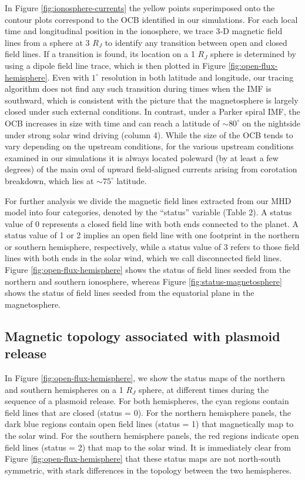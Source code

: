 In Figure \ref{fig:ionosphere-currents} the yellow points superimposed onto the contour plots correspond to the OCB identified in our simulations. For each local time and longitudinal position in the ionosphere, we trace 3‐D magnetic field lines from a sphere at 3 $R_J$ to identify any transition between open and closed field lines. If a transition is found, its location on a 1 $R_J$ sphere is determined by using a dipole field line trace, which is then plotted in Figure \ref{fig:open-flux-hemisphere}. Even with $1^\circ$ resolution in both latitude and longitude, our tracing algorithm does not find any such transition during times when the IMF is southward, which is consistent with the picture that the magnetosphere is largely closed under such external conditions. In contrast, under a Parker spiral IMF, the OCB increases in size with time and can reach a latitude of $\sim80^\circ$ on the nightside under strong solar wind driving (column 4). While the size of the OCB tends to vary depending on the upstream conditions, for the various upstream conditions examined in our simulations it is always located poleward (by at least a few degrees) of the main oval of upward field‐aligned currents arising from corotation breakdown, which lies at $\sim75^\circ$ latitude. 

For further analysis we divide the magnetic field lines extracted from our MHD model into four categories, denoted by the “status” variable (Table 2). A status value of 0 represents a closed field line with both ends connected to the planet. A status value of 1 or 2 implies an open field line with one footprint in the northern or southern hemisphere, respectively, while a status value of 3 refers to those field lines with both ends in the solar wind, which we call disconnected field lines. Figure \ref{fig:open-flux-hemisphere} shows the status of field lines seeded from the northern and southern ionosphere, whereas Figure \ref{fig:status-magnetosphere} shows the status of field lines seeded from the equatorial plane in the magnetosphere. 

\subsection{Magnetic topology associated with plasmoid release}

In Figure \ref{fig:open-flux-hemisphere}, we show the status maps of the northern and southern hemispheres on a 1 $R_J$ sphere, at different times during the sequence of a plasmoid release. For both hemispheres, the cyan regions contain field lines that are closed (status = 0). For the northern hemisphere panels, the dark blue regions contain open field lines (status = 1) that magnetically map to the solar wind. For the southern hemisphere panels, the red regions indicate open field lines (status = 2) that map to the solar wind. It is immediately clear from Figure \ref{fig:open-flux-hemisphere} that these status maps are not north‐south symmetric, with stark differences in the topology between the two hemispheres. 

